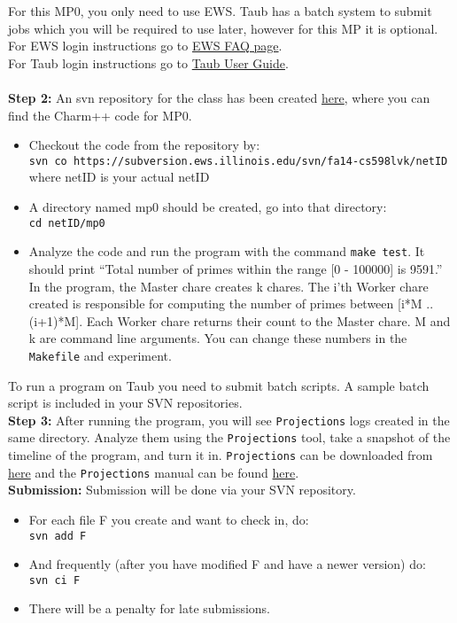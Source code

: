 \documentclass{article}
\begin{document}
For this MP0, you only need to use EWS. Taub has a batch
system to submit jobs which you will be required to use later, however for this MP
it is optional.\\
For EWS login instructions go to
\href{http://it.engineering.illinois.edu/ews/lab-information/ews-faq}{EWS FAQ page}.\\
For Taub login instructions go to
\href{https://campuscluster.illinois.edu/user\_info/doc/}{Taub User Guide}.\\
\\
\textbf{Step 2:} An svn repository for the class has been created
\href{https://subversion.ews.illinois.edu/svn/fa14-cs598lvk/}{here},
where you can find the Charm++ code for MP0.\\
\begin{itemize}
\item Checkout the code from the repository by:\\
        \texttt{svn co
        https://subversion.ews.illinois.edu/svn/fa14-cs598lvk/netID}\\
        where netID is your actual netID
\item A directory named mp0 should be created, go into that directory:\\
        \texttt{cd netID/mp0}
\item Analyze the code and run the program with the command \texttt{make test}.
It should print ``Total number of primes within the range [0 - 100000] is 9591.''
In the program, the Master chare creates k chares.
The i'th Worker chare created is responsible for computing the number of primes between [i*M .. (i+1)*M].
Each Worker chare returns their count to the Master chare.
M and k are command line arguments.
You can change these numbers in the \texttt{Makefile} and experiment.

\end{itemize}
    To run a program on Taub you need to submit batch scripts.
    A sample batch script is included in your SVN repositories.\\

\textbf{Step 3:}  After running the program, you will see \texttt{Projections}
logs created in the same directory.
Analyze them using the \texttt{Projections} tool,
take a snapshot of the timeline of the program, and turn it in.
\texttt{Projections} can be downloaded from \href{http://charm.cs.illinois.edu/software}{here} and the
\texttt{Projections} manual can be found
\href{http://charm.cs.illinois.edu/manuals/html/projections/manual-1p.html}
{here}.\\

\textbf{Submission:}
Submission will be done via your SVN repository.
\begin{itemize}
\item  For each file F you create and want to check in, do:\\
        \texttt{svn add F}
\item  And frequently (after you have modified F and have a newer version) do:\\
        \texttt{svn ci F}
\item  There will be a penalty for late submissions.
\end{itemize}
\end{document}
